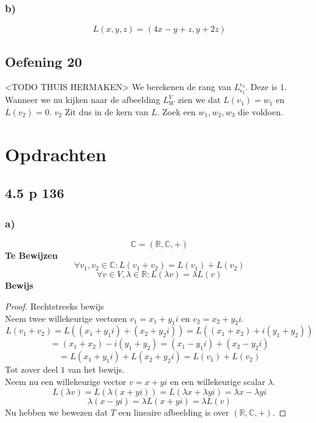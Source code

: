 \documentclass[lineaire_algebra_oplossingen.tex]{subfiles}
\begin{document}
\subsubsection*{b)}
\[
L(x,y,z) = (4x-y+z,y+2z)
\]

\subsection{Oefening 20}
<TODO THUIS HERMAKEN>
We berekenen de rang van $L_{\epsilon_2}^{\epsilon_3}$. Deze is $1$.
Wanneer we nu kijken naar de afbeelding $L_{W}^V$ zien we dat $L(v_1) = w_1$ en $L(v_2) = 0$. $v_2$ Zit dus in de kern van $L$.
Zoek een $w_1,w_2,w_3$ die voldoen.

\section{Opdrachten}

\subsection{4.5 p 136}
\subsubsection*{a)}
\[
\mathbb{C} = (\mathbb{R},\mathbb{C},+)
\]
\textbf{Te Bewijzen}\\
\[
\forall v_1,v_2 \in \mathbb{C}: L(v_1+v_2) = L(v_1)+L(v_2) 
\]
\[
\forall v\in V, \lambda \in \mathbb{R}: L(\lambda v) = \lambda L(v)
\]
\textbf{Bewijs}\\
\begin{proof}
Rechtstreeks bewijs\\
Neem twee willekeurige vectoren $v_1 = x_1+y_1i$ en $v_2=x_2+y_2i$.
\[
L(v_1+v_2)=L( (x_1+y_1i) + (x_2+y_2i)) = L((x_1+x_2) + i(y_1+y_2))
\]
\[
= (x_1+x_2)-i(y_1+y_2) = (x_1-y_1i) + (x_2-y_2i)
\]
\[
= L(x_1+y_1i) + L(x_2+y_2i) = L(v_1)+L(v_2)
\]
Tot zover deel $1$ van het bewijs.\\
Neem nu een willekeurige vector $v=x+yi$ en een willekeurige scalar $\lambda$.
\[
L(\lambda v) = L(\lambda (x+yi)) = L(\lambda x + \lambda yi) = \lambda x - \lambda yi
\]
\[
\lambda (x-yi) = \lambda L(x+yi) = \lambda L(v)
\]
Nu hebben we bewezen dat $T$ een lineaire afbeelding is over $(\mathbb{R},\mathbb{C},+)$.
\end{proof}
\end{document}
